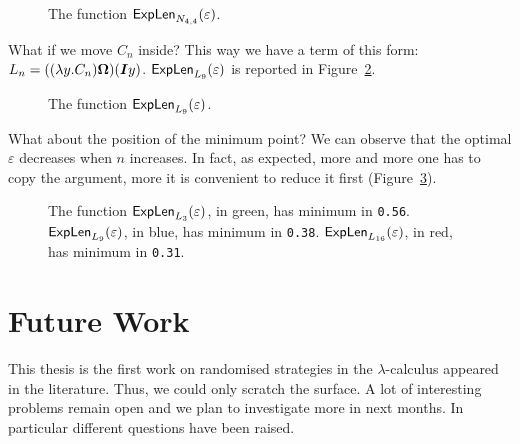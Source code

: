 \begin{figure}
		\caption{The function $\textsf{ExpLen}_{N_{4,4}}(\varepsilon)$.}
		\label{figure:strnor}
	\end{figure}
What if we move $C_n$ inside? This way we have a term of this form: $L_n=((\lambda y.C_n)\bm{\Omega})(\bm{I}y)$. $\textsf{ExpLen}_{L_9}(\varepsilon)$ is reported in Figure~\ref{figure:plot2}.
\begin{figure}
		\caption{The function $\textsf{ExpLen}_{L_9}(\varepsilon)$.}
		\label{figure:plot2}
	\end{figure}
What about the position of the minimum point? We can observe that the optimal $\varepsilon$ decreases when $n$ increases. In fact, as expected, more and more one has to copy the argument, more it is convenient to reduce it first (Figure~\ref{figure:plot3}).
\begin{figure}
		\caption[The function $\explen{\termthree_3}(\varepsilon)$.]{The function $\explen{\termthree_3}(\varepsilon)$, in green, has minimum in \texttt{0.56}. $\textsf{ExpLen}_{L_9}(\varepsilon)$, in blue, has minimum in \texttt{0.38}. $\textsf{ExpLen}_{L_{16}}(\varepsilon)$, in red, has minimum in \texttt{0.31}.}
		\label{figure:plot3}
	\end{figure}
\section{Future Work}
This thesis is the first work on randomised strategies in the $\lambda$-calculus appeared in the literature. Thus, we could only scratch the surface. A lot of interesting problems remain open and we plan to investigate more in next months. In particular different questions have been raised.
